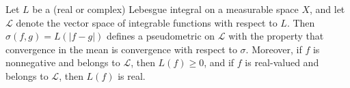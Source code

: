 Let $L$ be a (real or complex) Lebesgue integral on a measurable space $X$, and let $\mathcal{L}$ denote the vector space of integrable functions with respect to $L$. Then $\sigma(f,g) = L(|f-g|)$ defines a pseudometric on $\mathcal{L}$ with the property that convergence in the mean is convergence with respect to $\sigma$. Moreover, if $f$ is nonnegative and belongs to $\mathcal{L}$, then $L(f) \ge 0$, and if $f$ is real-valued and belongs to $\mathcal{L}$, then $L(f)$ is real.
